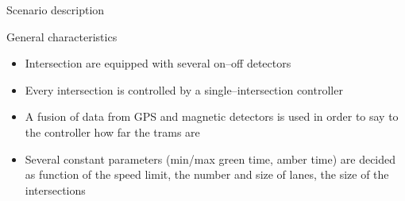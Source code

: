 \begin{frame}{Scenario description}
    \begin{exampleblock}{General characteristics}
    \begin{itemize}
    \item Intersection are equipped with several on--off detectors
    \item Every intersection is controlled by a single--intersection controller
    \item A fusion of data from GPS and magnetic detectors is used in order to say to the controller how far the trams are
    \item Several constant parameters (min/max green time, amber time) are decided as function of the speed limit, the number and size of lanes, the size of the intersections
    \end{itemize}
    \end{exampleblock}
\end{frame}
